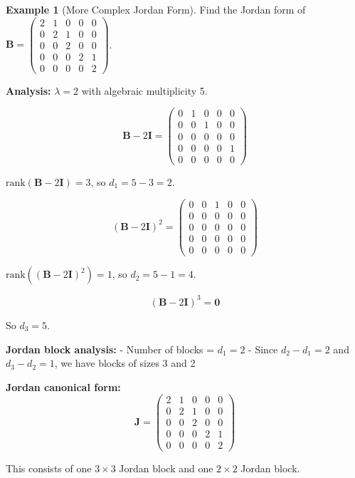 \documentclass[12pt]{article}
\numberwithin{equation}{section}
\newcommand{\mat}[1]{\mathbf{#1}}        %
\theoremstyle{plain}
\theoremstyle{definition}
\newtheorem{example}[theorem]{Example}
\theoremstyle{remark}
\begin{document}
\begin{example}[More Complex Jordan Form]
Find the Jordan form of $\mat{B} = \begin{pmatrix} 2 & 1 & 0 & 0 & 0 \\ 0 & 2 & 1 & 0 & 0 \\ 0 & 0 & 2 & 0 & 0 \\ 0 & 0 & 0 & 2 & 1 \\ 0 & 0 & 0 & 0 & 2 \end{pmatrix}$.

\textbf{Analysis:}
$\lambda = 2$ with algebraic multiplicity 5.

$$\mat{B} - 2\mat{I} = \begin{pmatrix} 0 & 1 & 0 & 0 & 0 \\ 0 & 0 & 1 & 0 & 0 \\ 0 & 0 & 0 & 0 & 0 \\ 0 & 0 & 0 & 0 & 1 \\ 0 & 0 & 0 & 0 & 0 \end{pmatrix}$$

$\text{rank}(\mat{B} - 2\mat{I}) = 3$, so $d_1 = 5 - 3 = 2$.

$$(\mat{B} - 2\mat{I})^2 = \begin{pmatrix} 0 & 0 & 1 & 0 & 0 \\ 0 & 0 & 0 & 0 & 0 \\ 0 & 0 & 0 & 0 & 0 \\ 0 & 0 & 0 & 0 & 0 \\ 0 & 0 & 0 & 0 & 0 \end{pmatrix}$$

$\text{rank}((\mat{B} - 2\mat{I})^2) = 1$, so $d_2 = 5 - 1 = 4$.

$$(\mat{B} - 2\mat{I})^3 = \mat{0}$$

So $d_3 = 5$.

\textbf{Jordan block analysis:}
- Number of blocks = $d_1 = 2$
- Since $d_2 - d_1 = 2$ and $d_3 - d_2 = 1$, we have blocks of sizes 3 and 2

\textbf{Jordan canonical form:}
$$\mat{J} = \begin{pmatrix} 2 & 1 & 0 & 0 & 0 \\ 0 & 2 & 1 & 0 & 0 \\ 0 & 0 & 2 & 0 & 0 \\ 0 & 0 & 0 & 2 & 1 \\ 0 & 0 & 0 & 0 & 2 \end{pmatrix}$$

This consists of one $3 \times 3$ Jordan block and one $2 \times 2$ Jordan block.
\end{example}
\end{document}
